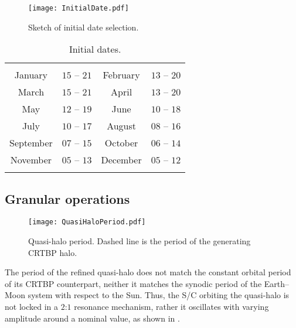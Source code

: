 %
\begin{figure}[b!]
	\centering
	\texttt{[image: InitialDate.pdf]}
	\caption{Sketch of initial date selection.}
	\label{fig:InitialDateLUMIO}
\end{figure}
%
%
\begin{table}[]
	\centering
	\caption{Initial dates.}
	\begin{tabular}{cccc}
		\TOPlines
		\multicolumn{4}{c}{Year $2023$} \\
		\MIDline
		January & $15$ -- $21$ &
		February & $13$ -- $20$ \\
		March & $15$ -- $21$ &
		April & $13$ -- $20$ \\
		May & $12$ -- $19$ &
		June & $10$ -- $18$ \\
		July & $10$ -- $17$ &
		August & $08$ -- $16$ \\
		September & $07$ -- $15$ &
		October & $06$ -- $14$ \\
		November & $05$ -- $13$ &
		December & $05$ -- $12$ \\
		\BOTTOMlines
	\end{tabular}
	\label{tab:InitialDateLUMIO}
\end{table}
%



\subsection{Granular operations}\label{subsec:granularops}
%
\begin{figure}[]
	\centering
	\texttt{[image: QuasiHaloPeriod.pdf]}
	\caption{Quasi-halo period. Dashed line is the period of the generating CRTBP halo.}
	\label{fig:QuasiHaloPeriod}
\end{figure}
%
The period of the refined quasi-halo does not match the constant orbital period of its {CRTBP} counterpart, neither it matches the synodic period of the Earth--Moon system with respect to the Sun. Thus, the S/C orbiting the quasi-halo is not locked in a $2$:$1$ resonance mechanism, rather it oscillates with varying amplitude around a nominal value, as shown in .

